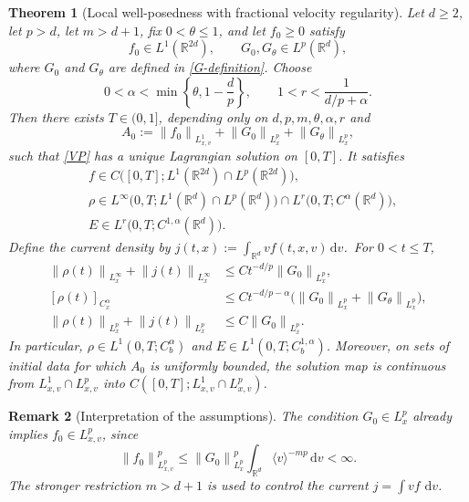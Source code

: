 \documentclass[11pt]{article}
\newtheorem{theorem}{Theorem}
\newtheorem{remark}[theorem]{Remark}
\newcommand{\R}{\mathbb R}
\newcommand{\la}{\langle}
\newcommand{\ra}{\rangle}
\newcommand{\norm}[1]{\left\lVert #1\right\rVert}
\newcommand{\dd}{\,\mathrm d}
\begin{document}
\begin{theorem}[Local well-posedness with fractional velocity regularity]\label{thm:main}
Let $d\geq2$, let $p>d$, let $m>d+1$, fix $0<\theta\leq1$, and let
$f_0\geq0$ satisfy
\begin{equation}\label{data-assumption}
 f_0\in L^1(\R^{2d}),\qquad
 G_0,G_\theta\in L^p(\R^d),
\end{equation}
where $G_0$ and $G_\theta$ are defined in \eqref{G-definition}.
Choose
\begin{equation}\label{alpha-r-choice}
 0<\alpha<\min\left\{\theta,1-\frac dp\right\},
 \qquad
 1<r<\frac{1}{d/p+\alpha}.
\end{equation}
Then there exists $T\in(0,1]$, depending only on
$d,p,m,\theta,\alpha,r$ and
\begin{equation*}
 A_0:=\norm{f_0}_{L^1_{x,v}}+\norm{G_0}_{L^p_x}+\norm{G_\theta}_{L^p_x},
\end{equation*}
such that \eqref{VP} has a unique Lagrangian solution on $[0,T]$.  It satisfies
 \begin{align}
 &f\in C\big([0,T];L^1(\R^{2d})\cap L^p(\R^{2d})\big),\label{fclass}\\
 &\rho\in L^\infty\big(0,T;L^1(\R^d)\cap L^p(\R^d)\big)
           \cap L^r\big(0,T;C^\alpha(\R^d)\big),\label{rhoclass}\\
 &E\in L^r\big(0,T;C^{1,\alpha}(\R^d)\big).\label{Eclass}
\end{align} 
Define the current density by
$j(t,x):=\int_{\R^d}v f(t,x,v)\dd v$.\
For $0<t\leq T$,
\begin{align}
 \norm{\rho(t)}_{L^\infty_x}
 +\norm{j(t)}_{L^\infty_x}
 &\leq C t^{-d/p}\norm{G_0}_{L^p_x},\label{rhoinfty}\\
 [\rho(t)]_{C^\alpha_x}
 &\leq C t^{-d/p-\alpha}
       \big(\norm{G_0}_{L^p_x}+\norm{G_\theta}_{L^p_x}\big),\label{rhoholder}\\
 \norm{\rho(t)}_{L^p_x}+\norm{j(t)}_{L^p_x}
 &\leq C\norm{G_0}_{L^p_x}.\label{currentbound}
\end{align}
In particular, $\rho\in L^1(0,T;C^\alpha_b)$ and
$E\in L^1(0,T;C^{1,\alpha}_b)$.
Moreover, on sets of initial data for which $A_0$ is uniformly bounded, the
solution map is continuous from $L^1_{x,v}\cap L^p_{x,v}$ into
$C([0,T];L^1_{x,v}\cap L^p_{x,v})$.
\end{theorem}

\begin{remark}[Interpretation of the assumptions]\label{rem:assumptions}
The condition $G_0\in L^p_x$ already implies $f_0\in L^p_{x,v}$, since
\begin{equation*}
 \norm{f_0}_{L^p_{x,v}}^p
 \leq \norm{G_0}_{L^p_x}^p
      \int_{\R^d}\la v\ra^{-mp}\dd v<\infty.
\end{equation*}
The stronger restriction $m>d+1$ is used to control the current
$j=\int vf\,\dd v$. 
\end{remark}
\end{document}
